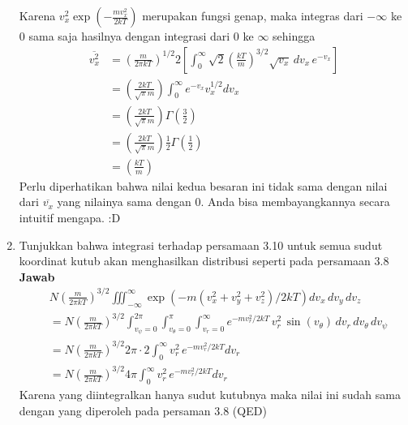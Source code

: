 \documentclass[a4paper , 12 pt]{article}
\begin{document}
\begin{enumerate}
Karena $\displaystyle v_x^2 \exp \left( - \frac{mv_x^2}{2 k T}\right) $ merupakan fungsi genap, maka integras dari $-\infty $ ke $0$ sama saja hasilnya dengan integrasi dari $0$ ke $\infty$ sehingga 
\begin{align}
\overline{v_x^2} & = \left(\frac{m}{2\pi k T}\right)^{1/2} 2 \left[ \int_{0}^{\infty} \sqrt{2} \left(\frac{k T}{m}\right)^{3/2} \sqrt{v_x} \, d v_x  \, e^{- v_x}\right] \nonumber \\
& = \left(\frac{2 k T}{\sqrt{\pi} m }\right) \int_{0}^{\infty} e^{-v_x} v_x^{1/2} dv_x \nonumber \\
& =  \left(\frac{2 k T}{\sqrt{\pi} m }\right) \Gamma \left(\frac{3}{2}\right) \nonumber \\
& =  \left(\frac{2 k T}{\sqrt{\pi} m }\right) \frac{1}{2}\Gamma \left(\frac{1}{2}\right) \nonumber \\
& = \left(\frac{k T}{m}\right) \tag{QED}
\end{align}
Perlu diperhatikan bahwa nilai kedua besaran ini tidak sama dengan nilai dari $\overline{v_x}$ yang nilainya sama dengan $0$. Anda bisa membayangkannya secara intuitif mengapa. :D 
\item Tunjukkan bahwa integrasi terhadap persamaan 3.10 untuk semua sudut koordinat kutub akan menghasilkan distribusi seperti pada persamaan 3.8 \newline 
\textbf{Jawab} 
\begin{align}
& N \left(\frac{m }{2 \pi k T}\right)^{3/2} \iiint_{-\infty}^{\infty} \exp \left( - m (v_x^2 + v_y^2 + v_z^2)/ 2 k T\right) dv_x \, dv_y \, dv_z \nonumber \\
& = N\left(\frac{m }{2 \pi k T}\right)^{3/2} \int_{v_\psi = 0}^{2\pi}\int_{v_\theta = 0}^{\pi} \int_{v_r = 0}^{\infty} e^{-  m v_r^2 /2 k T} \, v_r^2 \, \sin(v_\theta) \, dv_r \, dv_\theta \, d v_\psi \nonumber \\
& =  N\left(\frac{m }{2 \pi k T}\right)^{3/2}  2\pi  \cdot 2 \int_{0 }^{\infty} v_r^2 \, e^{- m v_r^2 /2 k T} dv_r\nonumber \\
& =  N\left(\frac{m }{2 \pi k T}\right)^{3/2}  4\pi  \int_{0 }^{\infty} v_r^2 \, e^{- m v_r^2 /2 k T} dv_r 
\nonumber
\end{align}
Karena yang diintegralkan hanya sudut kutubnya maka nilai ini sudah sama dengan yang diperoleh pada persaman 3.8 (QED)
\end{enumerate}
 
\end{document}
